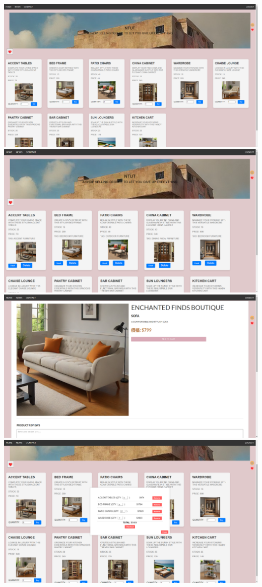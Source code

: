 \documentclass[a4paper, 12pt]{article}
\begin{document}
\begin{center}
\includegraphics[scale=0.3]{ui/shopManagerBuyer.png}
\includegraphics[scale=0.3]{ui/shopManagerSeller.png}
\includegraphics[scale=0.3]{ui/productDetail.png}
\includegraphics[scale=0.3]{ui/shoppingCart.png}

\end{center}
\end{document}

